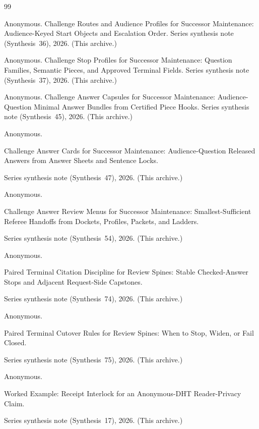 \documentclass[11pt]{article}
\begin{document}
\begin{thebibliography}{99}\small

Anonymous.
\newblock Challenge Routes and Audience Profiles for Successor Maintenance: Audience-Keyed Start Objects and Escalation Order.
\newblock Series synthesis note (Synthesis~36), 2026. (This archive.)

Anonymous.
\newblock Challenge Stop Profiles for Successor Maintenance: Question Families, Semantic Pieces, and Approved Terminal Fields.
\newblock Series synthesis note (Synthesis~37), 2026. (This archive.)

Anonymous.
\newblock Challenge Answer Capsules for Successor Maintenance: Audience-Question Minimal Answer Bundles from Certified Piece Hooks.
\newblock Series synthesis note (Synthesis~45), 2026. (This archive.)

Anonymous.

\newblock Challenge Answer Cards for Successor Maintenance: Audience-Question Released Answers from Answer Sheets and Sentence Locks.

\newblock Series synthesis note (Synthesis~47), 2026. (This archive.)

Anonymous.

\newblock Challenge Answer Review Menus for Successor Maintenance: Smallest-Sufficient Referee Handoffs from Dockets, Profiles, Packets, and Ladders.

\newblock Series synthesis note (Synthesis~54), 2026. (This archive.)

Anonymous.

\newblock Paired Terminal Citation Discipline for Review Spines: Stable Checked-Answer Stops and Adjacent Request-Side Capstones.

\newblock Series synthesis note (Synthesis~74), 2026. (This archive.)

Anonymous.

\newblock Paired Terminal Cutover Rules for Review Spines: When to Stop, Widen, or Fail Closed.

\newblock Series synthesis note (Synthesis~75), 2026. (This archive.)

Anonymous.

\newblock Worked Example: Receipt Interlock for an Anonymous-DHT Reader-Privacy Claim.

\newblock Series synthesis note (Synthesis~17), 2026. (This archive.)

\end{thebibliography}
\end{document}
